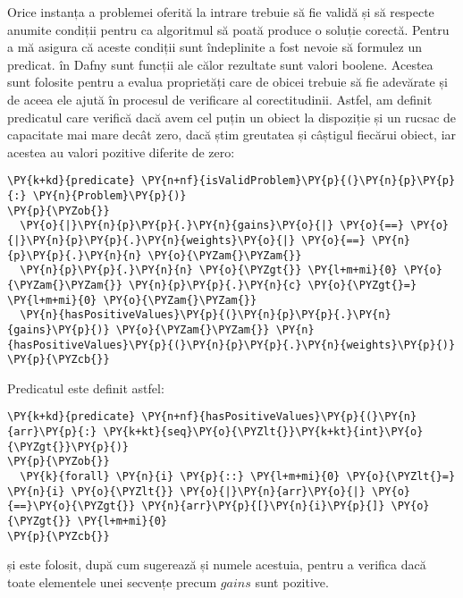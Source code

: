 \begin{sloppypar}
Orice instanța a problemei oferită la intrare trebuie să fie validă și să respecte anumite condiții pentru ca algoritmul să poată produce o soluție corectă. Pentru a mă asigura că aceste condiții sunt îndeplinite a fost nevoie să formulez un predicat.  în Dafny sunt funcții ale călor rezultate sunt valori boolene. Acestea sunt folosite pentru a evalua proprietăți care de obicei trebuie să fie adevărate și de aceea ele ajută în procesul de verificare al corectitudinii. Astfel, am definit predicatul  care verifică dacă avem cel puțin un obiect la dispoziție și un rucsac de capacitate mai mare decât zero, dacă știm greutatea și câștigul fiecărui obiect, iar acestea au valori pozitive diferite de zero:
    \begin{Verbatim}[commandchars=\\\{\}]
\PY{k+kd}{predicate} \PY{n+nf}{isValidProblem}\PY{p}{(}\PY{n}{p}\PY{p}{:} \PY{n}{Problem}\PY{p}{)}
\PY{p}{\PYZob{}}
  \PY{o}{|}\PY{n}{p}\PY{p}{.}\PY{n}{gains}\PY{o}{|} \PY{o}{==} \PY{o}{|}\PY{n}{p}\PY{p}{.}\PY{n}{weights}\PY{o}{|} \PY{o}{==} \PY{n}{p}\PY{p}{.}\PY{n}{n} \PY{o}{\PYZam{}\PYZam{}} 
  \PY{n}{p}\PY{p}{.}\PY{n}{n} \PY{o}{\PYZgt{}} \PY{l+m+mi}{0} \PY{o}{\PYZam{}\PYZam{}} \PY{n}{p}\PY{p}{.}\PY{n}{c} \PY{o}{\PYZgt{}=} \PY{l+m+mi}{0} \PY{o}{\PYZam{}\PYZam{}} 
  \PY{n}{hasPositiveValues}\PY{p}{(}\PY{n}{p}\PY{p}{.}\PY{n}{gains}\PY{p}{)} \PY{o}{\PYZam{}\PYZam{}} \PY{n}{hasPositiveValues}\PY{p}{(}\PY{n}{p}\PY{p}{.}\PY{n}{weights}\PY{p}{)} 
\PY{p}{\PYZcb{}}
\end{Verbatim}
\par Predicatul  este definit astfel:
    \begin{Verbatim}[commandchars=\\\{\}]
\PY{k+kd}{predicate} \PY{n+nf}{hasPositiveValues}\PY{p}{(}\PY{n}{arr}\PY{p}{:} \PY{k+kt}{seq}\PY{o}{\PYZlt{}}\PY{k+kt}{int}\PY{o}{\PYZgt{}}\PY{p}{)}
\PY{p}{\PYZob{}}
  \PY{k}{forall} \PY{n}{i} \PY{p}{::} \PY{l+m+mi}{0} \PY{o}{\PYZlt{}=} \PY{n}{i} \PY{o}{\PYZlt{}} \PY{o}{|}\PY{n}{arr}\PY{o}{|} \PY{o}{==}\PY{o}{\PYZgt{}} \PY{n}{arr}\PY{p}{[}\PY{n}{i}\PY{p}{]} \PY{o}{\PYZgt{}} \PY{l+m+mi}{0}
\PY{p}{\PYZcb{}}
\end{Verbatim}
    și este folosit, după cum sugerează și numele acestuia, pentru a verifica dacă toate elementele unei secvențe precum $gains$ sunt pozitive. \\ \par 


\end{sloppypar}
